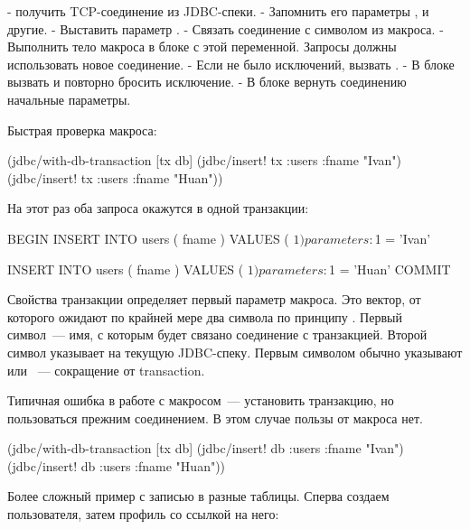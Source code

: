 - получить TCP-соединение из JDBC-спеки.
- Запомнить его параметры ,  и другие.
- Выставить параметр .
- Связать соединение с символом из макроса.
- Выполнить тело макроса в блоке  с этой переменной. Запросы должны использовать новое соединение.
- Если не было исключений, вызвать .
- В блоке  вызвать  и повторно бросить исключение.
- В блоке  вернуть соединению начальные параметры.

Быстрая проверка макроса:

\begin{english}
  \begin{clojure}
(jdbc/with-db-transaction [tx db]
  (jdbc/insert! tx :users {:fname "Ivan"})
  (jdbc/insert! tx :users {:fname "Huan"}))
  \end{clojure}
\end{english}

На этот раз оба запроса окажутся в одной транзакции:

\begin{english}
  \begin{sql}
BEGIN
INSERT INTO users ( fname ) VALUES ( $1 )
parameters: $1 = 'Ivan'

INSERT INTO users ( fname ) VALUES ( $1 )
parameters: $1 = 'Huan'
COMMIT
  \end{sql}
\end{english}

Свойства транзакции определяет первый параметр макроса. Это вектор, от которого ожидают по крайней мере два символа по принципу . Первый символ~--- имя, с которым будет связано соединение с транзакцией. Второй символ указывает на текущую JDBC-спеку. Первым символом обычно указывают  или ~--- сокращение от transaction.

Типичная ошибка в работе с макросом~--- установить транзакцию, но пользоваться прежним соединением. В этом случае пользы от макроса нет.

\begin{english}
  \begin{clojure}
(jdbc/with-db-transaction [tx db]
  (jdbc/insert! db :users {:fname "Ivan"})
  (jdbc/insert! db :users {:fname "Huan"}))
  \end{clojure}
\end{english}

Более сложный пример с записью в разные таблицы. Сперва создаем пользователя, затем профиль со ссылкой на него:

